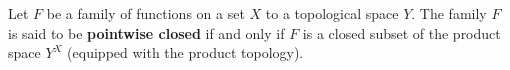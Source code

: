 Let $F$ be a family of functions on a set $X$ to a topological space $Y$. The family $F$ is said to be \textbf{pointwise closed} if and only if $F$ is a closed subset of the product space $Y^X$ (equipped with the product topology).
